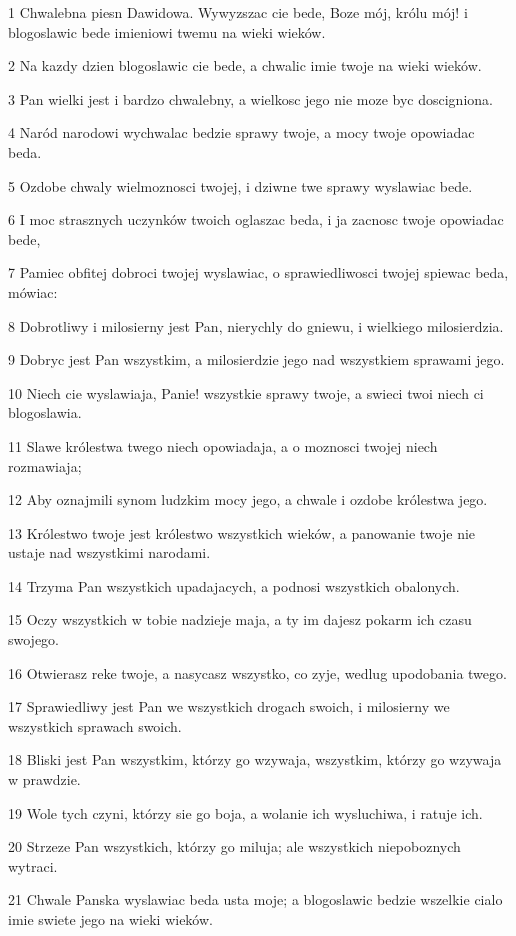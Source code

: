 \par 1 Chwalebna piesn Dawidowa. Wywyzszac cie bede, Boze mój, królu mój! i blogoslawic bede imieniowi twemu na wieki wieków.
\par 2 Na kazdy dzien blogoslawic cie bede, a chwalic imie twoje na wieki wieków.
\par 3 Pan wielki jest i bardzo chwalebny, a wielkosc jego nie moze byc doscigniona.
\par 4 Naród narodowi wychwalac bedzie sprawy twoje, a mocy twoje opowiadac beda.
\par 5 Ozdobe chwaly wielmoznosci twojej, i dziwne twe sprawy wyslawiac bede.
\par 6 I moc strasznych uczynków twoich oglaszac beda, i ja zacnosc twoje opowiadac bede,
\par 7 Pamiec obfitej dobroci twojej wyslawiac, o sprawiedliwosci twojej spiewac beda, mówiac:
\par 8 Dobrotliwy i milosierny jest Pan, nierychly do gniewu, i wielkiego milosierdzia.
\par 9 Dobryc jest Pan wszystkim, a milosierdzie jego nad wszystkiem sprawami jego.
\par 10 Niech cie wyslawiaja, Panie! wszystkie sprawy twoje, a swieci twoi niech ci blogoslawia.
\par 11 Slawe królestwa twego niech opowiadaja, a o moznosci twojej niech rozmawiaja;
\par 12 Aby oznajmili synom ludzkim mocy jego, a chwale i ozdobe królestwa jego.
\par 13 Królestwo twoje jest królestwo wszystkich wieków, a panowanie twoje nie ustaje nad wszystkimi narodami.
\par 14 Trzyma Pan wszystkich upadajacych, a podnosi wszystkich obalonych.
\par 15 Oczy wszystkich w tobie nadzieje maja, a ty im dajesz pokarm ich czasu swojego.
\par 16 Otwierasz reke twoje, a nasycasz wszystko, co zyje, wedlug upodobania twego.
\par 17 Sprawiedliwy jest Pan we wszystkich drogach swoich, i milosierny we wszystkich sprawach swoich.
\par 18 Bliski jest Pan wszystkim, którzy go wzywaja, wszystkim, którzy go wzywaja w prawdzie.
\par 19 Wole tych czyni, którzy sie go boja, a wolanie ich wysluchiwa, i ratuje ich.
\par 20 Strzeze Pan wszystkich, którzy go miluja; ale wszystkich niepoboznych wytraci.
\par 21 Chwale Panska wyslawiac beda usta moje; a blogoslawic bedzie wszelkie cialo imie swiete jego na wieki wieków.

